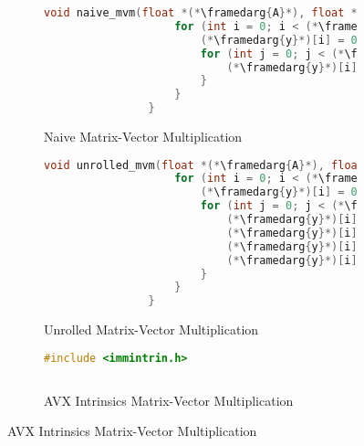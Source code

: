 \documentclass[manuscript,screen,review]{acmart}
\newcommand{\framedarg}[1]{
	\tikz[baseline=(char.base)]
	\node[draw=blue, rectangle, inner sep=1pt, anchor=base] (char) {#1};
}
\begin{document}
	
	\begin{figure}[h]
		\centering
		\begin{subfigure}[t]{0.45\textwidth}
			\centering
			\caption{Naive Matrix-Vector Multiplication}
			\label{lst:naive}
			\begin{lstlisting}[language=C]
				void naive_mvm(float *(*\framedarg{A}*), float *(*\framedarg{x}*), float *(*\framedarg{y}*), int (*\framedarg{N}*)) {
					for (int i = 0; i < (*\framedarg{N}*); ++i) {
						(*\framedarg{y}*)[i] = 0;
						for (int j = 0; j < (*\framedarg{N}*); ++j) {
							(*\framedarg{y}*)[i] += (*\framedarg{A}*)[i * (*\framedarg{N}*) + j] * (*\framedarg{x}*)[j];
						}
					}
				}
			\end{lstlisting}
		\end{subfigure}
		\hspace{1em}
		\begin{subfigure}[t]{0.45\textwidth}
			\centering
			\caption{Unrolled Matrix-Vector Multiplication}
			\label{lst:unrolled}
			\begin{lstlisting}[language=C]
				void unrolled_mvm(float *(*\framedarg{A}*), float *(*\framedarg{x}*), float *(*\framedarg{y}*), int (*\framedarg{N}*)) {
					for (int i = 0; i < (*\framedarg{N}*); ++i) {
						(*\framedarg{y}*)[i] = 0;
						for (int j = 0; j < (*\framedarg{N}*); j += 4) {
							(*\framedarg{y}*)[i] += (*\framedarg{A}*)[i * (*\framedarg{N}*) + j] * (*\framedarg{x}*)[j];
							(*\framedarg{y}*)[i] += (*\framedarg{A}*)[i * (*\framedarg{N}*) + j + 1] * (*\framedarg{x}*)[j + 1];
							(*\framedarg{y}*)[i] += (*\framedarg{A}*)[i * (*\framedarg{N}*) + j + 2] * (*\framedarg{x}*)[j + 2];
							(*\framedarg{y}*)[i] += (*\framedarg{A}*)[i * (*\framedarg{N}*) + j + 3] * (*\framedarg{x}*)[j + 3];
						}
					}
				}
			\end{lstlisting}
		\end{subfigure}
		\vspace{1em}
		\begin{subfigure}[t]{0.45\textwidth}
			\centering
			\caption{AVX Intrinsics Matrix-Vector Multiplication}
			\label{lst:avx}
			\begin{lstlisting}[language=C++]
				#include <immintrin.h>
				

\end{lstlisting}
\end{subfigure}
\end{figure}
\end{document}
